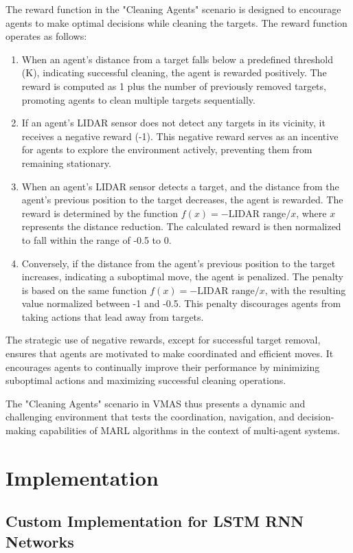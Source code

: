 \documentclass{scrartcl}
\begin{document}
The reward function in the "Cleaning Agents" scenario is designed to encourage agents to make optimal decisions while cleaning the targets. The reward function operates as follows:
\begin{enumerate}
  \item When an agent's distance from a target falls below a predefined threshold (K), indicating successful cleaning, the agent is rewarded positively. The reward is computed as 1 plus the number of previously removed targets, promoting agents to clean multiple targets sequentially.
  \item If an agent's LIDAR sensor does not detect any targets in its vicinity, it receives a negative reward (-1). This negative reward serves as an incentive for agents to explore the environment actively, preventing them from remaining stationary.
  \item When an agent's LIDAR sensor detects a target, and the distance from the agent's previous position to the target decreases, the agent is rewarded. The reward is determined by the function $f(x) = -\text{LIDAR range}/x$, where $x$ represents the distance reduction. The calculated reward is then normalized to fall within the range of -0.5 to 0.
  \item Conversely, if the distance from the agent's previous position to the target increases, indicating a suboptimal move, the agent is penalized. The penalty is based on the same function $f(x) = -\text{LIDAR range}/x$, with the resulting value normalized between -1 and -0.5. This penalty discourages agents from taking actions that lead away from targets.
\end{enumerate}
The strategic use of negative rewards, except for successful target removal, ensures that agents are motivated to make coordinated and efficient moves. It encourages agents to continually improve their performance by minimizing suboptimal actions and maximizing successful cleaning operations.

The "Cleaning Agents" scenario in VMAS thus presents a dynamic and challenging environment that tests the coordination, navigation, and decision-making capabilities of MARL algorithms in the context of multi-agent systems.

\section{Implementation}
\subsection{Custom Implementation for LSTM RNN Networks}
\end{document}
